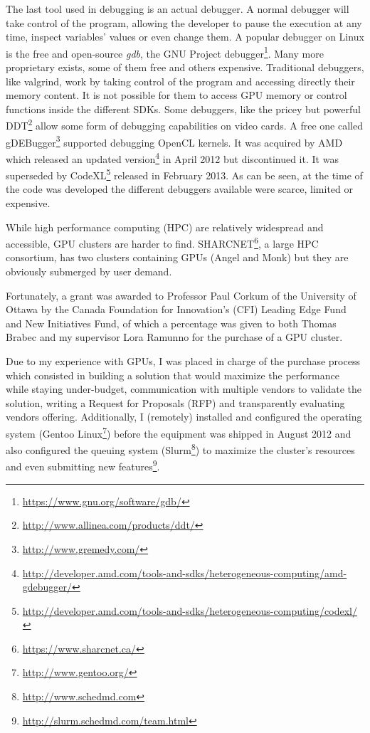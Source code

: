 The last tool used in debugging is an actual debugger. A normal debugger will
take control of the program, allowing the developer to pause the execution
at any time, inspect variables' values or even change them. A popular debugger
on Linux is the free and open-source \textit{gdb}, the GNU Project
debugger\footnote{\url{https://www.gnu.org/software/gdb/}}. Many more
proprietary exists, some of them free and others expensive. Traditional
debuggers, like valgrind, work by taking control of the program and accessing
directly their memory content. It is not possible for them to access GPU memory
or control functions inside the different SDKs. Some debuggers, like
the pricey but powerful DDT\footnote{\url{http://www.allinea.com/products/ddt/}}
allow some form of debugging capabilities on video cards. A free one
called gDEBugger\footnote{\url{http://www.gremedy.com/}} supported
debugging OpenCL kernels. It was acquired by AMD which released an updated
version\footnote{\url{http://developer.amd.com/tools-and-sdks/heterogeneous-computing/amd-gdebugger/}}
in April 2012 but discontinued it. It was superseded by
CodeXL\footnote{\url{http://developer.amd.com/tools-and-sdks/heterogeneous-computing/codexl/}}
released in February 2013. As can be seen, at the time of the code was developed
the different debuggers available were scarce, limited or expensive.


While high performance computing (HPC) are relatively widespread and accessible,
GPU clusters are harder to find.
SHARCNET\footnote{\url{https://www.sharcnet.ca/}}, a large HPC
consortium, has two clusters containing GPUs (Angel and Monk) but they are
obviously submerged by user demand.

Fortunately, a grant was awarded to Professor Paul Corkum of the University of
Ottawa by the Canada Foundation for Innovation's (CFI) Leading Edge Fund and
New Initiatives Fund, of which a percentage was given to both Thomas Brabec
and my supervisor Lora Ramunno for the purchase of a GPU cluster.

Due to my experience with GPUs, I was placed in charge of the purchase process
which consisted in building a solution that would maximize the performance
while staying under-budget, communication with multiple vendors to validate
the solution, writing a Request for Proposals (RFP) and transparently evaluating
vendors offering. Additionally, I (remotely) installed and configured the
operating system (Gentoo Linux\footnote{\url{http://www.gentoo.org/}}) before
the equipment was shipped in August 2012 and also configured the queuing system
(Slurm\footnote{\url{http://www.schedmd.com}}) to maximize the cluster's
resources and even submitting new
features\footnote{\url{http://slurm.schedmd.com/team.html}}.

